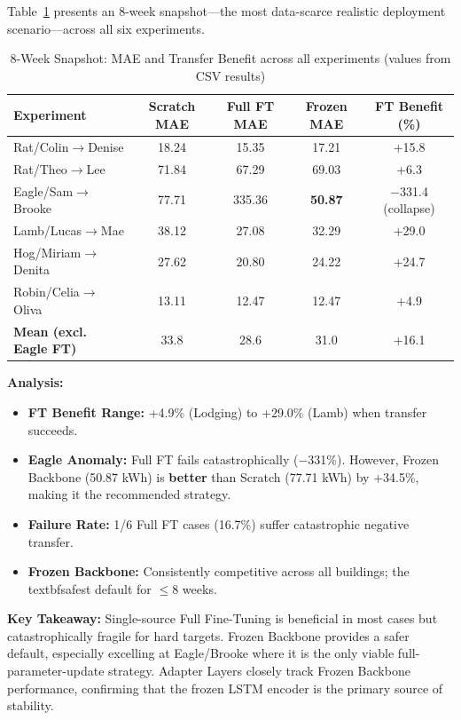 \documentclass[12pt,a4paper]{report}
\begin{document}
Table~\ref{tab:8week_snapshot} presents an 8-week snapshot—the most data-scarce realistic deployment scenario—across all six experiments.

\begin{table}[H]
\centering
\caption{8-Week Snapshot: MAE and Transfer Benefit across all experiments (values from CSV results)}
\label{tab:8week_snapshot}
\small
\begin{tabular}{lcccc}
\toprule
\textbf{Experiment} & \textbf{Scratch MAE} & \textbf{Full FT MAE} & \textbf{Frozen MAE} & \textbf{FT Benefit (\%)} \\
\midrule
Rat/Colin$\to$Denise & 18.24 & 15.35 & 17.21 & +15.8 \\
Rat/Theo$\to$Lee & 71.84 & 67.29 & 69.03 & +6.3 \\
Eagle/Sam$\to$Brooke & 77.71 & 335.36 & \textbf{50.87} & $-$331.4 (collapse) \\
Lamb/Lucas$\to$Mae & 38.12 & 27.08 & 32.29 & +29.0 \\
Hog/Miriam$\to$Denita & 27.62 & 20.80 & 24.22 & +24.7 \\
Robin/Celia$\to$Oliva & 13.11 & 12.47 & 12.47 & +4.9 \\
\midrule
\textbf{Mean (excl. Eagle FT)} & 33.8 & 28.6 & 31.0 & +16.1 \\
\bottomrule
\end{tabular}
\end{table}

\textbf{Analysis:}

\begin{itemize}
    \item \textbf{FT Benefit Range:} +4.9\% (Lodging) to +29.0\% (Lamb) when transfer succeeds.
    \item \textbf{Eagle Anomaly:} Full FT fails catastrophically ($-$331\%). However, Frozen Backbone (50.87 kWh) is \textbf{better} than Scratch (77.71 kWh) by +34.5\%, making it the recommended strategy.
    \item \textbf{Failure Rate:} 1/6 Full FT cases (16.7\%) suffer catastrophic negative transfer.
    \item \textbf{Frozen Backbone:} Consistently competitive across all buildings; the \\textbf{safest} default for $\leq$8 weeks.
\end{itemize}

\textbf{Key Takeaway:} Single-source Full Fine-Tuning is beneficial in most cases but catastrophically fragile for hard targets. Frozen Backbone provides a safer default, especially excelling at Eagle/Brooke where it is the only viable full-parameter-update strategy. Adapter Layers closely track Frozen Backbone performance, confirming that the frozen LSTM encoder is the primary source of stability.
\end{document}
